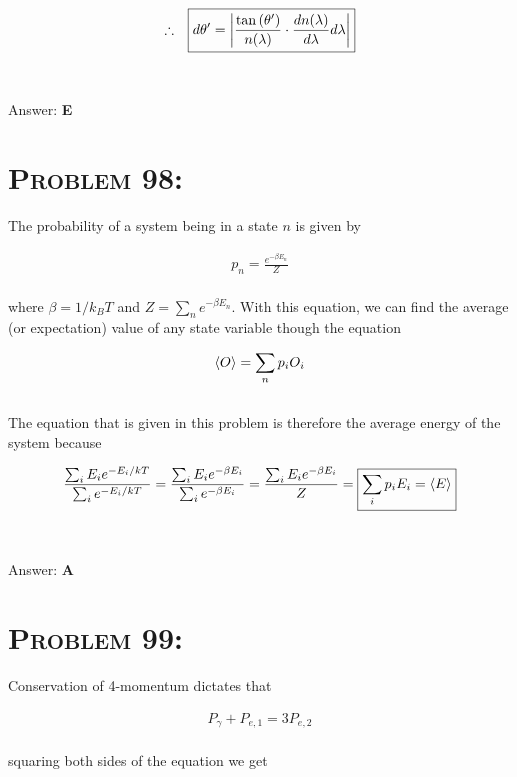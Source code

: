 \documentclass{article}
\begin{document}
\begin{gather}
\therefore \hspace{.1in} \boxed{d\theta' = \left|  \frac{\tan{(\theta')}}{n(\lambda)} \cdot \frac{d n(\lambda)}{d \lambda}   d \lambda \right|}\nonumber
\end{gather}
\\\\
Answer: \textbf{\textcolor{ProcessBlue}E}\\


\section{\textsc{Problem 98:}} The probability of a system being in a state $n$ is given by

\begin{gather}
p_{n} = \frac{e^{-\beta E_{n}}}{Z}
\end{gather}
\\
where $\beta = 1/k_{B} T$ and $Z = \sum_{n}{e^{-\beta E_{n}}}$. With this equation, we can find the average (or expectation) value of any state variable though the equation

\begin{gather}
\braket{O} = \sum_{n}{p_{i} O_{i}}
\end{gather}
\\
The equation that is given in this problem is therefore the average energy of the system because

\begin{gather}
\frac{\sum_{i}{E_{i}e^{-E_{i}/kT}}}{\sum_{i}{e^{-E_{i}/kT}}} = \frac{\sum_{i}{E_{i}e^{-\beta E_{i}}}}{\sum_{i}{e^{-\beta E_{i}}}} = \frac{\sum_{i}{E_{i}e^{-\beta E_{i}}}}{Z}  = \boxed{\sum_{i}{p_{i} E_{i} } = \braket{E}}\nonumber
\end{gather}
\\\\
Answer: \textbf{\textcolor{ProcessBlue}A}\\


\section{\textsc{Problem 99:}} Conservation of 4-momentum dictates that

\begin{gather}
P_{\gamma} + P_{e,1} = 3 P_{e,2}\nonumber
\end{gather}
\\
squaring both sides of the equation we get
\end{document}
